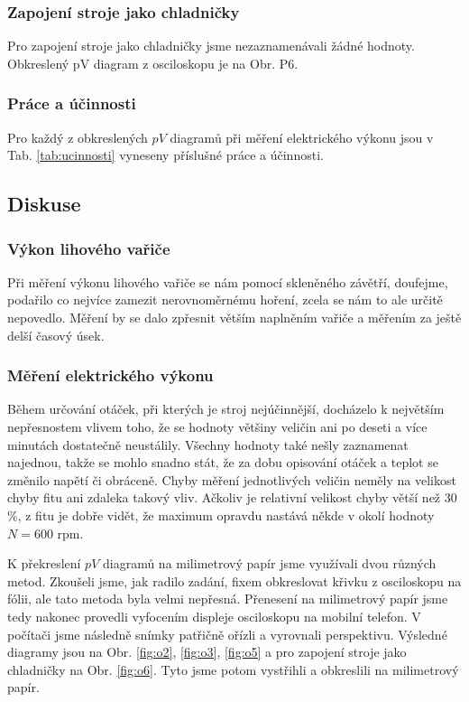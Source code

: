 \documentclass[english]{article}
\begin{document}
	\subsubsection{Zapojení stroje jako chladničky}
		Pro zapojení stroje jako chladničky jsme nezaznamenávali žádné hodnoty. Obkreslený pV diagram z osciloskopu je na Obr. P6. 
	 
	\subsubsection{Práce a účinnosti}
		Pro každý z obkreslených $pV$ diagramů při měření elektrického výkonu jsou v Tab. \ref{tab:ucinnosti} vyneseny příslušné práce a účinnosti. 
		
\subsection{Diskuse}
	\subsubsection{Výkon lihového vařiče}
		Při měření výkonu lihového vařiče se nám pomocí skleněného závětří, doufejme, podařilo co nejvíce zamezit nerovnoměrnému hoření, zcela se nám to ale určitě nepovedlo. Měření by se dalo zpřesnit větším naplněním vařiče a měřením za ještě delší časový úsek. 
	
	\subsubsection{Měření elektrického výkonu}
		Během určování otáček, při kterých je stroj nejúčinnější, docházelo k největším nepřesnostem vlivem toho, že se hodnoty většiny veličin ani po deseti a více minutách dostatečně neustálily. Všechny hodnoty také nešly zaznamenat najednou, takže se mohlo snadno stát, že za dobu opisování otáček a teplot se změnilo napětí či obráceně. Chyby měření jednotlivých veličin neměly na velikost chyby fitu ani zdaleka takový vliv. Ačkoliv je relativní velikost chyby větší než 30 \%, z fitu je dobře vidět, že maximum opravdu nastává někde v okolí hodnoty $N = 600$ rpm. 
	
		K překreslení $pV$ diagramů na milimetrový papír jsme využívali dvou různých metod. Zkoušeli jsme, jak radilo zadání, fixem obkreslovat křivku z osciloskopu na fólii, ale tato metoda byla velmi nepřesná. Přenesení na milimetrový papír jsme tedy nakonec provedli vyfocením displeje osciloskopu na mobilní telefon. V počítači jsme následně snímky patřičně ořízli a vyrovnali perspektivu. Výsledné diagramy jsou na Obr. \ref{fig:o2}, \ref{fig:o3}, \ref{fig:o5} a pro zapojení stroje jako chladničky na Obr. \ref{fig:o6}. Tyto jsme potom vystřihli a obkreslili na milimetrový papír. 
		
\end{document}
